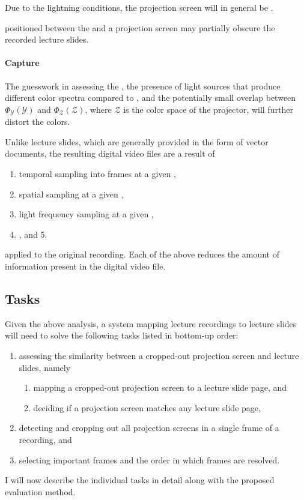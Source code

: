 Due to the lightning conditions, the projection screen will in general be
.

 positioned between the  and a projection
screen may partially obscure the recorded lecture slides.

\paragraph{Capture} The guesswork in assessing the ,
the presence of light sources that produce different color spectra compared to
, and the potentially small overlap between $\Phi_{\mathcal
Y}(\mathcal Y)$ and $\Phi_{\mathcal Z}(\mathcal Z)$, where $\mathcal Z$ is the
color space of the projector, will further distort the colors.

Unlike lecture slides, which are generally provided in the form of vector
 documents, the resulting digital video files are a result of
\begin{enumerate}
  \item temporal sampling into frames at a given ,
  \item spatial sampling at a given ,
  \item light frequency sampling at a given ,
  \item {}, and 5. 
\end{enumerate}
applied to the original recording. Each of the above reduces the amount of
information present in the digital video file.

\subsection{Tasks}
Given the above analysis, a system mapping lecture recordings to lecture slides
will need to solve the following tasks listed in bottom-up order:
\begin{enumerate}
  \item assessing the similarity between a cropped-out projection screen and
    lecture slides, namely
    \begin{enumerate}
      \item mapping a cropped-out projection screen to a lecture slide page, and
      \item deciding if a projection screen matches any lecture slide page,
    \end{enumerate}
  \item detecting and cropping out all projection screens in a single frame
    of a recording, and
  \item selecting important frames and the order in which frames are resolved.
\end{enumerate}
I will now describe the individual tasks in detail along with the proposed
evaluation method.

